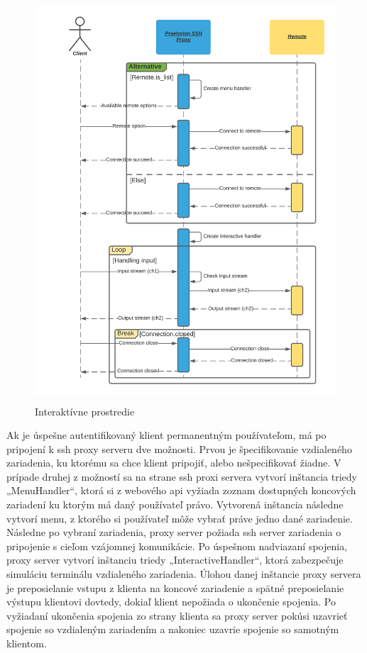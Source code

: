 \begin{figure}[H]
\begin{center}\includegraphics[width=\textwidth,height=15cm,keepaspectratio=true]{assets/sequence_diagram_interactive.png}\end{center}
\caption[Interaktívne prostredie]{Interaktívne prostredie}\label{fig:obr_11}
\end{figure}

Ak je úspešne autentifikovaný klient permanentným používateľom, má po pripojení k ssh proxy serveru dve možnosti.
Prvou je špecifikovanie vzdialeného zariadenia, ku ktorému sa chce klient pripojiť, alebo nešpecifikovať žiadne.
V prípade druhej z možností sa na strane ssh proxi servera vytvorí inštancia triedy „MenuHandler“, ktorá si z webového api
vyžiada zoznam dostupných koncových zariadení ku ktorým má daný používateľ právo.
Vytvorená inštancia následne vytvorí menu, z ktorého si používateľ môže vybrať práve jedno dané zariadenie.
Následne po vybraní zariadenia, proxy server požiada ssh server zariadenia o pripojenie s cieľom vzájomnej komunikácie.
Po úspešnom nadviazaní spojenia, proxy server vytvorí inštanciu triedy „InteractiveHandler“, ktorá zabezpečuje simuláciu
terminálu vzdialeného zariadenia.
Úlohou danej inštancie proxy servera je preposielanie vstupu z klienta na koncové zariadenie a spätné preposielanie výstupu
klientovi dovtedy, dokiaľ klient nepožiada o ukončenie spojenia.
Po vyžiadaní ukončenia spojenia zo strany klienta sa proxy server pokúsi uzavrieť spojenie so vzdialeným zariadením a nakoniec
uzavrie spojenie so samotným klientom.

